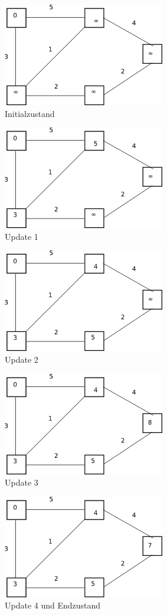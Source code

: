 \documentclass[10pt,a4paper]{article}
\begin{document}
\begin{figure}[h]
  \centering
  \includegraphics[width=200pt]{6_8_1}
  \caption{Initialzustand}
\end{figure}
\begin{figure}[h]
  \centering
  \includegraphics[width=200pt]{6_8_2}
  \caption{Update 1}
\end{figure}
\begin{figure}[h]
  \centering
  \includegraphics[width=200pt]{6_8_3}
  \caption{Update 2}
\end{figure}
\begin{figure}[h]
  \centering
  \includegraphics[width=200pt]{6_8_4}
  \caption{Update 3}
\end{figure}
\begin{figure}[h]
  \centering
  \includegraphics[width=200pt]{6_8_5}
  \caption{Update 4 und Endzustand}
\end{figure}
\end{document}

